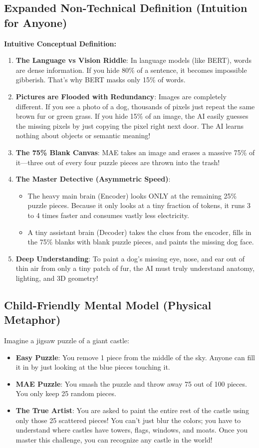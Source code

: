 \documentclass[11pt,a4paper]{article}
\theoremstyle{definition}
\begin{document}
\subsection{Expanded Non-Technical Definition (Intuition for Anyone)}
\textbf{Intuitive Conceptual Definition:}
\begin{enumerate}
    \item \textbf{The Language vs Vision Riddle}: In language models (like BERT), words are dense information. If you hide 80\% of a sentence, it becomes impossible gibberish. That's why BERT masks only 15\% of words.
    \item \textbf{Pictures are Flooded with Redundancy}: Images are completely different. If you see a photo of a dog, thousands of pixels just repeat the same brown fur or green grass. If you hide 15\% of an image, the AI easily guesses the missing pixels by just copying the pixel right next door. The AI learns nothing about objects or semantic meaning!
    \item \textbf{The 75\% Blank Canvas}: MAE takes an image and erases a massive 75\% of it—three out of every four puzzle pieces are thrown into the trash!
    \item \textbf{The Master Detective (Asymmetric Speed)}:
    \begin{itemize}
        \item The heavy main brain (Encoder) looks ONLY at the remaining 25\% puzzle pieces. Because it only looks at a tiny fraction of tokens, it runs 3 to 4 times faster and consumes vastly less electricity.
        \item A tiny assistant brain (Decoder) takes the clues from the encoder, fills in the 75\% blanks with blank puzzle pieces, and paints the missing dog face.
    \end{itemize}
    \item \textbf{Deep Understanding}: To paint a dog's missing eye, nose, and ear out of thin air from only a tiny patch of fur, the AI must truly understand anatomy, lighting, and 3D geometry!
\end{enumerate}

\subsection{Child-Friendly Mental Model (Physical Metaphor)}
Imagine a jigsaw puzzle of a giant castle:
\begin{itemize}
    \item \textbf{Easy Puzzle}: You remove 1 piece from the middle of the sky. Anyone can fill it in by just looking at the blue pieces touching it.
    \item \textbf{MAE Puzzle}: You smash the puzzle and throw away 75 out of 100 pieces. You only keep 25 random pieces.
    \item \textbf{The True Artist}: You are asked to paint the entire rest of the castle using only those 25 scattered pieces! You can't just blur the colors; you have to understand where castles have towers, flags, windows, and moats. Once you master this challenge, you can recognize any castle in the world!
\end{itemize}
\end{document}
